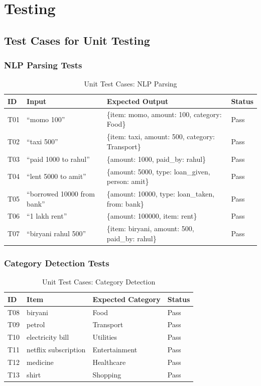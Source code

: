 \section{Testing}

\subsection{Test Cases for Unit Testing}

\subsubsection{NLP Parsing Tests}

\begin{table}[H]
\centering
\caption{Unit Test Cases: NLP Parsing}
\label{tab:unit-tests-nlp}
\begin{tabular}{|p{1cm}|p{3.5cm}|p{3.5cm}|p{4cm}|}
\hline
\textbf{ID} & \textbf{Input} & \textbf{Expected Output} & \textbf{Status} \\
\hline
T01 & ``momo 100'' & \{item: momo, amount: 100, category: Food\} & Pass \\
\hline
T02 & ``taxi 500'' & \{item: taxi, amount: 500, category: Transport\} & Pass \\
\hline
T03 & ``paid 1000 to rahul'' & \{amount: 1000, paid\_by: rahul\} & Pass \\
\hline
T04 & ``lent 5000 to amit'' & \{amount: 5000, type: loan\_given, person: amit\} & Pass \\
\hline
T05 & ``borrowed 10000 from bank'' & \{amount: 10000, type: loan\_taken, from: bank\} & Pass \\
\hline
T06 & ``1 lakh rent'' & \{amount: 100000, item: rent\} & Pass \\
\hline
T07 & ``biryani rahul 500'' & \{item: biryani, amount: 500, paid\_by: rahul\} & Pass \\
\hline
\end{tabular}
\end{table}

\subsubsection{Category Detection Tests}

\begin{table}[H]
\centering
\caption{Unit Test Cases: Category Detection}
\label{tab:unit-tests-category}
\begin{tabular}{|p{1cm}|p{4cm}|p{4cm}|p{3cm}|}
\hline
\textbf{ID} & \textbf{Item} & \textbf{Expected Category} & \textbf{Status} \\
\hline
T08 & biryani & Food & Pass \\
\hline
T09 & petrol & Transport & Pass \\
\hline
T10 & electricity bill & Utilities & Pass \\
\hline
T11 & netflix subscription & Entertainment & Pass \\
\hline
T12 & medicine & Healthcare & Pass \\
\hline
T13 & shirt & Shopping & Pass \\
\hline
\end{tabular}
\end{table}

